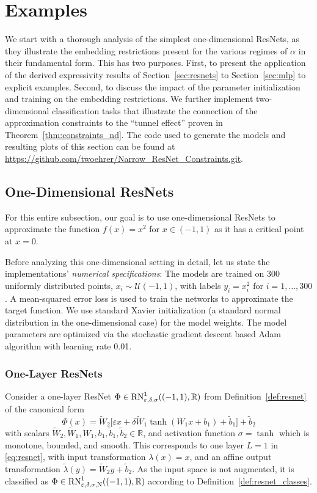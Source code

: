 \documentclass[10pt]{article}
\theoremstyle{definition}
\numberwithin{equation}{section}
\newcommand{\eps}{\varepsilon}
\newcommand{\R}{\mathbb{R}}
\newcommand{\Wt}{\widetilde{W}}
\newcommand{\bt}{\tilde{b}}
\begin{document}
\section{Examples}
 \label{sec:numerics}

We start with a thorough analysis of the simplest one-dimensional ResNets, as they illustrate the embedding restrictions present for the various regimes of $\alpha$ in their fundamental form. This has two purposes. First, to present the application of the derived expressivity results of Section~\ref{sec:resnets} to Section~\ref{sec:mlp} to explicit examples. Second, to discuss the impact of the parameter initialization and training on the embedding restrictions. We further implement two-dimensional classification tasks that illustrate the connection of the approximation constraints to the ``tunnel effect'' proven in Theorem~\ref{thm:constraints_nd}. The code used to generate the models and resulting plots of this section can be found at \url{https://github.com/twoehrer/Narrow_ResNet_Constraints.git}.

\subsection{One-Dimensional ResNets}\label{subsec:1dexamples}
For this entire subsection, our goal is to use one-dimensional ResNets to approximate the function $f(x) = x^2$ for $x\in (-1,1)$ as it has a critical point at $x = 0$. \medskip

Before analyzing this one-dimensional setting in detail, let us state the implementations' \emph{numerical specifications}: The models are trained on 300 uniformly distributed points, $x_i \sim \mathcal{U}(-1,1)$, with labels $y_i = x_i^2$ for $i = 1,\ldots, 300$. A mean-squared error loss is used to train the networks to approximate the target function. We use standard Xavier initialization (a standard normal distribution in the one-dimensional case) for the model weights. The model parameters are optimized via the stochastic gradient descent based Adam algorithm with learning rate 0.01. 

\subsubsection{One-Layer ResNets}
  Consider a one-layer ResNet $\Phi \in \textup{RN}^1_{\eps,\delta,\sigma}((-1,1),\R)$ from Definition~\ref{def:resnet} of the canonical form
    \begin{equation}
        \Phi(x) = \widetilde{W}_2 \big[ \eps x + \delta \widetilde{W}_1\tanh(W_1x+b_1) + \bt_1 \big]+\tilde{b}_2 \label{eq:onelayermodel}
    \end{equation}
    with scalars $\Wt_2,\Wt_1, W_1, b_1, \bt_1, \bt_2 \in \R$, and activation function $\sigma = \tanh$ which is monotone, bounded, and smooth.
    This corresponds to one layer $L=1$ in \eqref{eq:resnet}, with input transformation $\lambda(x) = x$, and an affine output transformation $\tilde{\lambda}(y) = \widetilde{W}_2y + \tilde{b}_2$. As the input space is not augmented, it is classified as $\Phi \in \textup{RN}^1_{\eps,\delta, \sigma, \textup{N}}((-1,1),\R)$ according to Definition~\ref{def:resnet_classes}.
\end{document}
